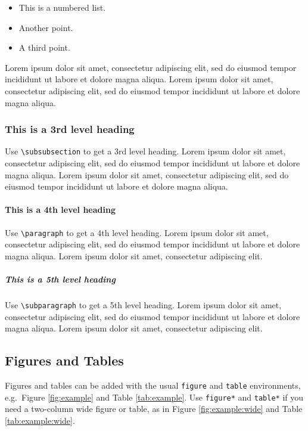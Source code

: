 \documentclass[a4paper,num-refs]{oup-contemporary}
\begin{document}
\begin{itemize}
\item This is a numbered list.
\item Another point.
\item A third point.
\end{itemize}

Lorem ipsum dolor sit amet, consectetur adipiscing elit, sed do eiusmod tempor incididunt ut labore et dolore magna aliqua. Lorem ipsum dolor sit amet, consectetur adipiscing elit, sed do eiusmod tempor incididunt ut labore et dolore magna aliqua.


\subsubsection{This is a 3rd level heading}

Use \verb|\subsubsection| to get a 3rd level heading.
Lorem ipsum dolor sit amet, consectetur adipiscing elit, sed do eiusmod tempor incididunt ut labore et dolore magna aliqua. Lorem ipsum dolor sit amet, consectetur adipiscing elit, sed do eiusmod tempor incididunt ut labore et dolore magna aliqua.


\paragraph{This is a 4th level heading}

Use \verb|\paragraph| to get a 4th level heading.
Lorem ipsum dolor sit amet, consectetur adipiscing elit, sed do eiusmod tempor incididunt ut labore et dolore magna aliqua. Lorem ipsum dolor sit amet, consectetur adipiscing elit.

\subparagraph{This is a 5th level heading}

Use \verb|\subparagraph| to get a 5th level heading.
Lorem ipsum dolor sit amet, consectetur adipiscing elit, sed do eiusmod tempor incididunt ut labore et dolore magna aliqua. Lorem ipsum dolor sit amet, consectetur adipiscing elit.


\subsection{Figures and Tables}
Figures and tables can be added with the usual \verb|figure| and \verb|table| environments, e.g.~Figure \ref{fig:example} and Table \ref{tab:example}. Use \verb|figure*| and \verb|table*| if you need a two-column wide figure or table, as in Figure \ref{fig:example:wide} and Table \ref{tab:example:wide}.
\end{document}
